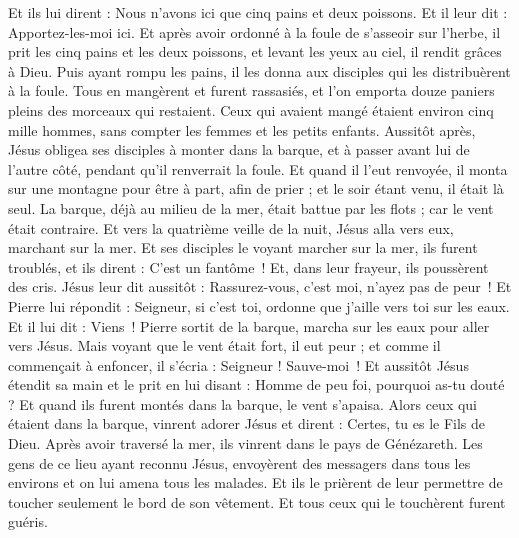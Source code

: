 \begin{multicols}{2}
{Et ils lui dirent : Nous n'avons ici que cinq pains et deux poissons.
Et il leur dit : Apportez-les-moi ici.
Et après avoir ordonné à la foule de s'asseoir sur l'herbe, il prit les cinq pains et les deux poissons, et levant les yeux au ciel, il rendit grâces à Dieu. Puis ayant rompu les pains, il les donna aux disciples qui les distribuèrent à la foule.
Tous en mangèrent et furent rassasiés, et l’on emporta douze paniers pleins des morceaux qui restaient.
Ceux qui avaient mangé étaient environ cinq mille hommes, sans compter les femmes et les petits enfants.
Aussitôt après, Jésus obligea ses disciples à monter dans la barque, et à passer avant lui de l'autre côté, pendant qu'il renverrait la foule.
Et quand il l’eut renvoyée, il monta sur une montagne pour être à part, afin de prier ; et le soir étant venu, il était là seul.
La barque, déjà au milieu de la mer, était battue par les flots ; car le vent était contraire.
Et vers la quatrième veille de la nuit, Jésus alla vers eux, marchant sur la mer.
Et ses disciples le voyant marcher sur la mer, ils furent troublés, et ils dirent : C’est un fantôme ! Et, dans leur frayeur, ils poussèrent des cris.
Jésus leur dit aussitôt : Rassurez-vous, c'est moi, n'ayez pas de peur !
Et Pierre lui répondit : Seigneur, si c'est toi, ordonne que j'aille vers toi sur les eaux.
Et il lui dit : Viens ! Pierre sortit de la barque, marcha sur les eaux pour aller vers Jésus.
Mais voyant que le vent était fort, il eut peur ; et comme il commençait à enfoncer, il s'écria : Seigneur ! Sauve-moi !
Et aussitôt Jésus étendit sa main et le prit en lui disant : Homme de peu foi, pourquoi as-tu douté ?
Et quand ils furent montés dans la barque, le vent s'apaisa.
Alors ceux qui étaient dans la barque, vinrent adorer Jésus et dirent : Certes, tu es le Fils de Dieu.
Après avoir traversé la mer, ils vinrent dans le pays de Génézareth.
Les gens de ce lieu ayant reconnu Jésus, envoyèrent des messagers dans tous les environs et on lui amena tous les malades.
Et ils le prièrent de leur permettre de toucher seulement le bord de son vêtement. Et tous ceux qui le touchèrent furent guéris.
}
\end{multicols}
